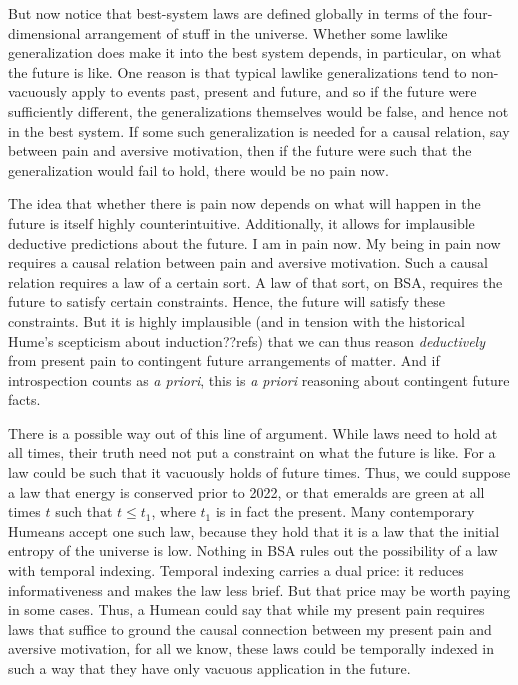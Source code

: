 But now notice that best-system laws are defined globally in terms of the four-dimensional arrangement of stuff in the universe. 
Whether some lawlike generalization does make it into the best system depends, in particular, on what the future is like. One reason 
is that typical lawlike generalizations tend to non-vacuously apply to events past, present and future, and so if the future 
were sufficiently different, the generalizations themselves would be false, and hence not in the best system. If some such generalization
is needed for a causal relation, say between pain and aversive motivation, then if the future were such that the generalization would fail
to hold, there would be no pain now. 

The idea that whether there is pain now depends on what will happen in the future is itself highly counterintuitive. Additionally, it 
allows for implausible deductive predictions about the future. I am in pain now. My being in pain now requires a causal relation between
pain and aversive motivation. Such a causal relation requires a law of a certain sort. A law of that sort, on BSA, requires the future
to satisfy certain constraints. Hence, the future will satisfy these constraints. But it is highly implausible (and in tension with the 
historical Hume's scepticism about induction??refs) that we can thus reason \textit{deductively} from present pain to contingent future arrangements
of matter. And if introspection counts as \textit{a priori}, this is \textit{a priori} reasoning about contingent future facts.

There is a possible way out of this line of argument. While laws need to hold at all times, their truth need not put a constraint on what the 
future is like. For a law could be such that it vacuously holds of future times. Thus, we could suppose a law that energy is conserved
prior to 2022, or that emeralds are green at all times $t$ such that $t\le t_1$, where $t_1$ is in fact the present. Many contemporary
Humeans accept one such law, because they hold that it is a law that the initial entropy of the universe is low. Nothing in BSA rules
out the possibility of a law with temporal indexing. Temporal indexing carries a dual price: it reduces informativeness and makes the law
less brief. But that price may be worth paying in some cases. Thus, a Humean could say that while my present pain requires laws that
suffice to ground the causal connection between my present pain and aversive motivation, for all we know, these laws could be temporally
indexed in such a way that they have only vacuous application in the future. 

